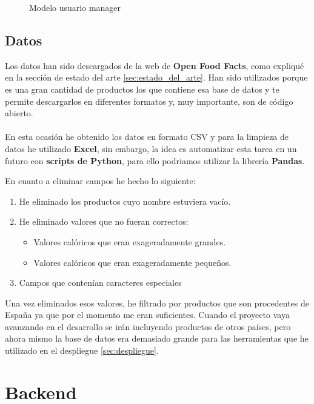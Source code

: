 \begin{figure}[H]
  \centering
  \noindent{}
  \caption{Modelo usuario manager}
\end{figure}

\subsection{Datos}

Los datos han sido descargados de la web de \textbf{Open Food Facts}, como expliqué en la sección de estado del arte \ref{sec:estado_del_arte}.
Han sido utilizados porque es una gran cantidad de productos los que contiene esa base de datos y te permite descargarlos en diferentes formatos y, muy importante,
son de código abierto.\\ \\

En esta ocasión he obtenido los datos en formato CSV y para la limpieza de datos he utilizado \textbf{Excel}, sin embargo, la idea es automatizar esta tarea en un futuro
con \textbf{scripts de Python}, para ello podriamos utilizar la librería \textbf{Pandas}.

En cuanto a eliminar campos he hecho lo siguiente:
\begin{enumerate}
  \item He eliminado los productos cuyo nombre estuviera vacío.
  \item He eliminado valores que no fueran correctos:
  \begin{itemize}
    \item Valores calóricos que eran exageradamente grandes.
    \item Valores calóricos que eran exageradamente pequeños.
  \end{itemize}
  \item Campos que contenían caracteres especiales
\end{enumerate}

Una vez eliminados esos valores, he filtrado por productos que son procedentes de España ya que por el momento me eran suficientes.
Cuando el proyecto vaya avanzando en el desarrollo se irán incluyendo productos de otros países, pero ahora mismo la base de datos era
 demasiado grande para las herramientas que he utilizado en el despliegue \ref{sec:despliegue}.\\

\section{Backend} \label{sec:backend}

